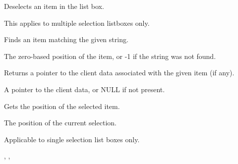 \label{wxlistboxdeselect}


Deselects an item in the list box.




This applies to multiple selection listboxes only.

\label{wxlistboxfindstring}


Finds an item matching the given string.




The zero-based position of the item, or -1 if the string was not found.

\label{wxlistboxgetclientdata}


Returns a pointer to the client data associated with the given item (if any).




A pointer to the client data, or NULL if not present.

\label{wxlistboxgetselection}


Gets the position of the selected item.


The position of the current selection.


Applicable to single selection list boxes only.


,\rtfsp
{},\rtfsp
{}


